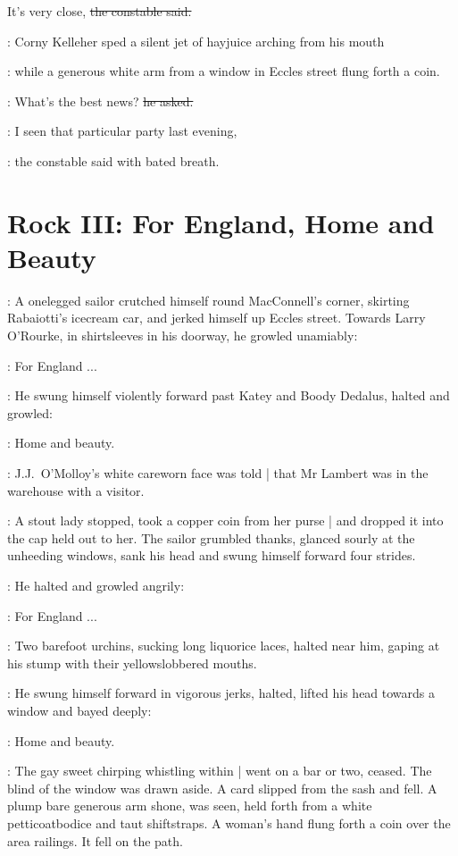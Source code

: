 \constable
It's very close,
\sout{the constable said.}

:
Corny Kelleher sped a silent jet of hayjuice arching from his mouth

:
while a generous white arm from a window in Eccles street
flung forth a coin.

\corny:
What's the best news? \sout{he asked.}

\constable:
I seen that particular party last evening,

:
the constable said with bated breath.


\section*{Rock III: For England, Home and Beauty}

:
A onelegged sailor crutched himself round MacConnell's corner,
skirting Rabaiotti's icecream car,
and jerked himself up Eccles street.
Towards Larry O'Rourke,
in shirtsleeves in his doorway,
he growled unamiably:

\sailor:
For England ...

:
He swung himself violently forward past Katey and Boody Dedalus,
halted and growled:

\sailor:
Home and beauty.

:
J.J.~O'Molloy's white careworn face was told |
that Mr Lambert was in the warehouse with a visitor.

:
A stout lady stopped,
took a copper coin from her purse |
and dropped it into the cap held out to her.
The sailor grumbled thanks,
glanced sourly at the unheeding windows,
sank his head
and swung himself forward four strides.

:
He halted and growled angrily:

\sailor:
For England ...

:
Two barefoot urchins,
sucking long liquorice laces,
halted near him,
gaping at his stump with their yellowslobbered mouths.

:
He swung himself forward in vigorous jerks,
halted,
lifted his head towards a window
and bayed deeply:

\sailor:
Home and beauty.

:
The gay sweet chirping whistling within |
went on a bar or two, ceased.
The blind of the window was drawn aside.
A card 
slipped from the sash and fell.
A plump bare generous arm shone,
was seen,
held forth from a white petticoatbodice and taut shiftstraps.
A woman's hand flung forth a coin
over the area railings.
It fell on the path.

